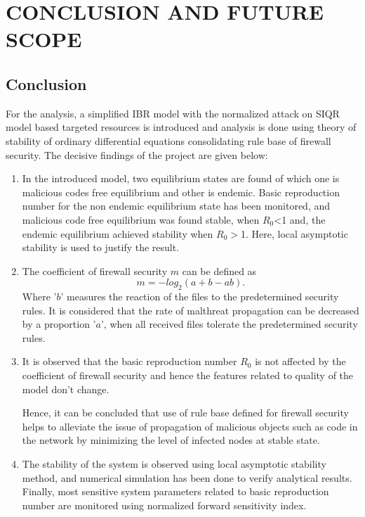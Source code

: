 \chapter{CONCLUSION AND FUTURE SCOPE}
\section{Conclusion}
For the analysis, a simplified IBR model with the normalized attack on SIQR model based targeted resources is
introduced and analysis is done using theory of stability of ordinary differential equations consolidating
rule base of firewall security. The decisive findings of the project are given below:
\begin{enumerate}
  \item In the introduced model, two equilibrium states are found of which one
is malicious codes free equilibrium and other is endemic. Basic reproduction number for
the non endemic equilibrium state has been monitored, and malicious code free
 equilibrium was found stable, when $R_0$\textless1 and, the endemic equilibrium achieved stability when $R_0$$>$1. Here, local asymptotic stability is used to justify the result.
  \item The coefficient of firewall security $m$ can be defined as
\begin{equation}
  m = - log_2 (a+b-ab).
\end{equation}
Where '$b$' measures the reaction of the files to the predetermined security rules. It is
considered that the rate of malthreat propagation can be decreased by a proportion '$a$',
when all received files tolerate the predetermined security rules.
  \item It is observed that the basic reproduction number $R_0$ is not affected by the
coefficient of firewall security and hence the features related to quality of the model don't
change.
\par Hence, it can be concluded that use of rule base defined for firewall security helps to alleviate the issue of propagation of
malicious objects such as code in the network by minimizing the level of infected nodes
at stable state.
  \item The stability of the system is observed using local asymptotic stability method, and
numerical simulation has been done to verify analytical results. Finally,
most sensitive system parameters related to basic reproduction number are monitored using
normalized forward sensitivity index.
\end{enumerate}

